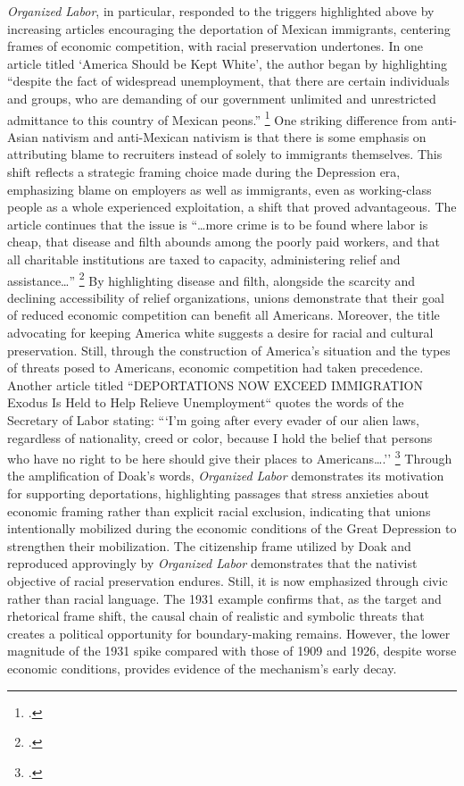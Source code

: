 \documentclass[12pt,a4paper]{article}
\begin{document}
\textit{Organized Labor}, in particular, responded to the triggers highlighted above by increasing articles encouraging the deportation of Mexican immigrants, centering frames of economic competition, with racial preservation undertones. In one article titled `America Should be Kept White', the author began by highlighting ``despite the fact of widespread unemployment, that there are certain individuals and groups, who are demanding of our government unlimited and unrestricted admittance to this country of Mexican peons.'' \footcite{noauthor_america_1930} One striking difference from anti-Asian nativism and anti-Mexican nativism is that there is some emphasis on attributing blame to recruiters instead of solely to immigrants themselves. This shift reflects a strategic framing choice made during the Depression era, emphasizing blame on employers as well as immigrants, even as working-class people as a whole experienced exploitation, a shift that proved advantageous. The article continues that the issue is ``\ldots more crime is to be found where labor is cheap, that disease and filth abounds among the poorly paid workers, and that all charitable institutions are taxed to capacity, administering relief and assistance\ldots''  \footcite{noauthor_america_1930} By highlighting disease and filth, alongside the scarcity and declining accessibility of relief organizations, unions demonstrate that their goal of reduced economic competition can benefit all Americans. Moreover, the title advocating for keeping America white suggests a desire for racial and cultural preservation. Still, through the construction of America’s situation and the types of threats posed to Americans, economic competition had taken precedence. Another article titled ``DEPORTATIONS NOW EXCEED IMMIGRATION Exodus Is Held to Help Relieve Unemployment`` quotes the words of the Secretary of Labor stating: ```I'm going after every evader of our alien laws, regardless of nationality, creed or color, because I hold the belief that persons who have no right to be here should give their places to Americans\dots.'' \footcite{noauthor_deportations_1931} Through the amplification of Doak’s words, \textit{Organized Labor} demonstrates its motivation for supporting deportations, highlighting passages that stress anxieties about economic framing rather than explicit racial exclusion, indicating that unions intentionally mobilized during the economic conditions of the Great Depression to strengthen their mobilization. The citizenship frame utilized by Doak and reproduced approvingly by \textit{Organized Labor} demonstrates that the nativist objective of racial preservation endures. Still, it is now emphasized through civic rather than racial language. The 1931 example confirms that, as the target and rhetorical frame shift, the causal chain of realistic and symbolic threats that creates a political opportunity for boundary-making remains. However, the lower magnitude of the 1931 spike compared with those of 1909 and 1926, despite worse economic conditions, provides evidence of the mechanism's early decay.
\end{document}
